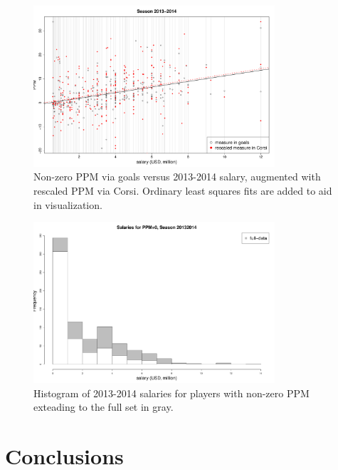 \begin{figure}[htb!]
	\centering
	\includegraphics[width=0.8\textwidth]{figures/ppmsal-scat.pdf}
	\caption{Non-zero PPM via goals versus 2013-2014 salary, augmented with rescaled PPM via Corsi. Ordinary least squares fits are added to aid in visualization.}\label{fig:ppmsal-scat}
\end{figure}

\begin{figure}[htb!]
	\centering
	\includegraphics[width=0.8\textwidth]{figures/salaryhist.pdf}
	\caption{Histogram of 2013-2014 salaries for players with non-zero PPM exteading to the full set in gray.}\label{fig:salaryhist}
\end{figure}


\section{Conclusions}
\label{sec:conclude}


